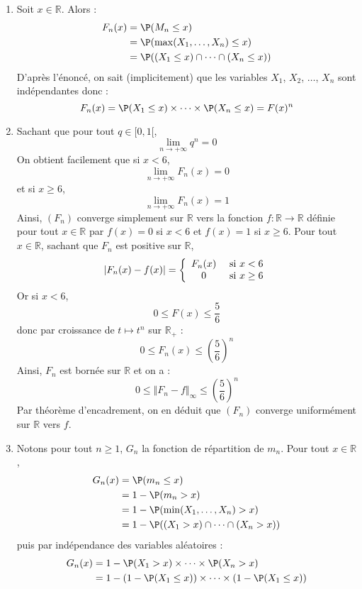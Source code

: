 \documentclass[a4paper,10pt]{report}
\begin{document}
\begin{enumerate}
\item Soit $x \in \mathbb{R}$. Alors :
\begin{align*}
 F_n(x) & = \P(M_n \leq x) \\
 & = \P(\max(X_1, \ldots, X_n) \leq x) \\
 & = \P((X_1 \leq x) \cap \cdots \cap  (X_n \leq x)) 
\end{align*}
D'après l'énoncé, on sait (implicitement) que les variables $X_1$, $X_2$, $\ldots$, $X_n$ sont indépendantes donc :
$$ F_n(x) = \P(X_1 \leq x) \times \cdots \times \P(X_n \leq x) = F(x)^n$$
\item Sachant que pour tout $q \in [0,1[$,
$$ \lim_{n \rightarrow + \infty} q^n = 0$$
On obtient facilement que si $x<6$,
$$ \lim_{n \rightarrow + \infty} F_n(x) = 0$$ 
et si $x \geq 6$,
$$ \lim_{n \rightarrow + \infty} F_n(x)=1$$
Ainsi, $(F_n)$ converge simplement sur $\mathbb{R}$ vers la fonction $f : \mathbb{R} \rightarrow \mathbb{R}$ définie pour tout $x \in \mathbb{R}$ par $f(x) = 0$ si $x<6$ et $f(x)=1$ si $x \geq 6$.
Pour tout $x \in \mathbb{R}$, sachant que $F_n$ est positive sur $\mathbb{R}$,
$$ \vert F_n(x) -f(x) \vert = \left\lbrace \begin{array}{cl}
F_n(x) & \hbox{ si } x < 6 \\
0 & \hbox{ si } x \geq 6  \\
\end{array}\right.$$
Or si $x<6$, 
$$0 \leq F(x) \leq \dfrac{5}{6}$$
donc par croissance de $t \mapsto t^n$ sur $\mathbb{R}_+$ :
$$ 0 \leq F_n(x) \leq \left( \dfrac{5}{6} \right)^n$$
Ainsi, $F_n$ est bornée sur $\mathbb{R}$ et on a :
$$0 \leq \Vert F_n -f \Vert_{\infty} \leq \left( \dfrac{5}{6} \right)^n$$
Par théorème d'encadrement, on en déduit que $(F_n)$ converge uniformément sur $\mathbb{R}$ vers $f$.
\item Notons pour tout $n \geq 1$, $G_n$ la fonction de répartition de $m_n$. Pour tout $x \in \mathbb{R}$,
\begin{align*}
 G_n(x) & = \P(m_n \leq x) \\
 & = 1 - \P(m_n >x) \\
 & =1-\P(\min(X_1, \ldots, X_n) > x) \\
 & =1-\P((X_1 > x) \cap \cdots \cap  (X_n > x)) 
\end{align*}
puis par indépendance des variables aléatoires :
\begin{align*}
 G_n(x) & =1-\P(X_1 > x) \times  \cdots \times \P(X_n > x) \\
 & = 1- (1-\P(X_1 \leq x)) \times \cdots \times (1-\P(X_1 \leq x)) \\

\end{align*}
\end{enumerate}
\end{document}
